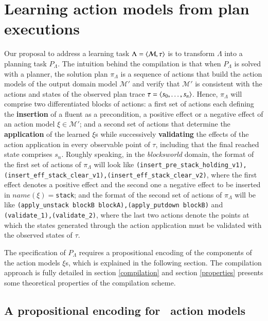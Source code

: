 
\section{Learning action models from plan executions}
\label{sec:learning}

Our proposal to address a learning task $\Lambda={\langle \mathcal{M},\tau \rangle}$ is to transform $\Lambda$ into a planning task $P_{\Lambda}$. The intuition behind the compilation is that when $P_{\Lambda}$ is solved with a planner, the solution plan $\pi_\Lambda$ is a sequence of actions that build the action models of the output domain model $\mathcal{M'}$ and verify that $\mathcal{M'}$ is consistent with the actions and states of the observed plan trace $\tau = {\langle s_0, \ldots, s_n \rangle}$. Hence, $\pi_\Lambda$ will comprise two differentiated blocks of actions: a first set of actions each defining the \textbf{insertion} of a fluent as a precondition, a positive effect or a negative effect of an action model $\xi \in \mathcal{M'}$; and a second set of actions that determine the \textbf{application} of the learned $\xi$s while successively \textbf{validating} the effects of the action application in every observable point of $\tau$, including that the final reached state comprises $s_n$. Roughly speaking, in the \emph{blocksworld} domain, the format of the first set of actions of $\pi_\Lambda$ will look like {\tt{\small (insert\_pre\_stack\_holding\_v1),(insert\_eff\_stack\_clear\_v1),(insert\_eff\_stack\_clear\_v2)}}, where the first effect denotes a positive effect and the second one a negative effect to be inserted in $name(\xi)=${\tt{\small stack}}; and the format of the second set of actions of $\pi_\Lambda$ will be like {\tt{\small (apply\_unstack blockB blockA),(apply\_putdown blockB)}} and {\tt{\small (validate\_1),(validate\_2)}}, where the last two actions denote the points at which the states generated through the action application must be validated with the observed states of $\tau$.

\vspace{0.1cm}

The specification of $P_{\Lambda}$ requires a propositional encoding of the components of the action models $\xi$s, which is explained in the following section. The compilation approach is fully detailed in section \ref{compilation} and section \ref{properties} presents some theoretical properties of the compilation scheme.




\subsection{A propositional encoding for \strips\ action models}
\label{propositional_encoding}

